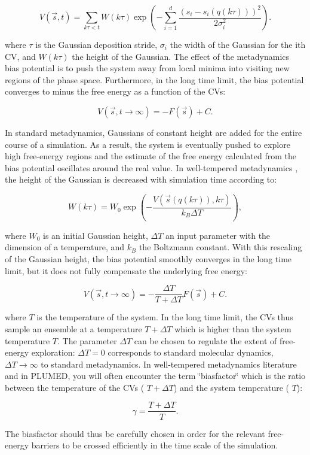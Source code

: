 \[ V(\vec{s},t) = \sum_{ k \tau < t} W(k \tau) \exp\left( -\sum_{i=1}^{d} \frac{(s_i-s_i({q}(k \tau)))^2}{2\sigma_i^2} \right). \]

where $ \tau $ is the Gaussian deposition stride, $ \sigma_i $ the width of the Gaussian for the ith C\+V, and $ W(k \tau) $ the height of the Gaussian. The effect of the metadynamics bias potential is to push the system away from local minima into visiting new regions of the phase space. Furthermore, in the long time limit, the bias potential converges to minus the free energy as a function of the C\+Vs\+:

\[ V(\vec{s},t\rightarrow \infty) = -F(\vec{s}) + C. \]

In standard metadynamics, Gaussians of constant height are added for the entire course of a simulation. As a result, the system is eventually pushed to explore high free-\/energy regions and the estimate of the free energy calculated from the bias potential oscillates around the real value. In well-\/tempered metadynamics \cite{Barducci:2008}, the height of the Gaussian is decreased with simulation time according to\+:

\[ W (k \tau ) = W_0 \exp \left( -\frac{V(\vec{s}({q}(k \tau)),k \tau)}{k_B\Delta T} \right ), \]

where $ W_0 $ is an initial Gaussian height, $ \Delta T $ an input parameter with the dimension of a temperature, and $ k_B $ the Boltzmann constant. With this rescaling of the Gaussian height, the bias potential smoothly converges in the long time limit, but it does not fully compensate the underlying free energy\+:

\[ V(\vec{s},t\rightarrow \infty) = -\frac{\Delta T}{T+\Delta T}F(\vec{s}) + C. \]

where $ T $ is the temperature of the system. In the long time limit, the C\+Vs thus sample an ensemble at a temperature $ T+\Delta T $ which is higher than the system temperature $ T $. The parameter $ \Delta T $ can be chosen to regulate the extent of free-\/energy exploration\+: $ \Delta T = 0$ corresponds to standard molecular dynamics, $ \Delta T \rightarrow \infty $ to standard metadynamics. In well-\/tempered metadynamics literature and in P\+L\+U\+M\+E\+D, you will often encounter the term \char`\"{}biasfactor\char`\"{} which is the ratio between the temperature of the C\+Vs ( $ T+\Delta T $) and the system temperature ( $ T $)\+:

\[ \gamma = \frac{T+\Delta T}{T}. \]

The biasfactor should thus be carefully chosen in order for the relevant free-\/energy barriers to be crossed efficiently in the time scale of the simulation.

